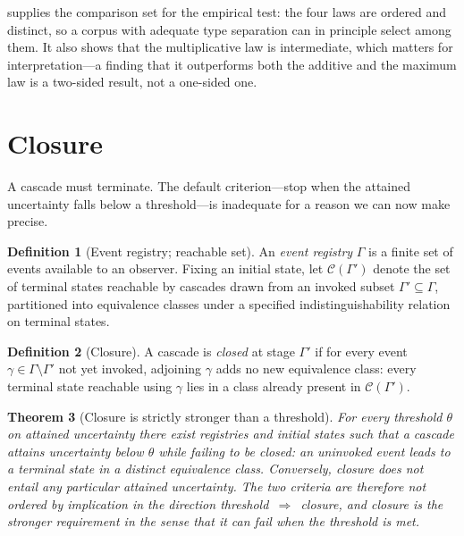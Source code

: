 \documentclass[11pt,a4paper]{article}
\theoremstyle{thmstyle}
\newtheorem{theorem}{Theorem}[section]
\theoremstyle{definition}
\newtheorem{definition}[theorem]{Definition}
\theoremstyle{remark}
\begin{document}
 supplies the comparison set for the empirical test:
the four laws are ordered and distinct, so a corpus with adequate type
separation can in principle select among them. It also shows that the
multiplicative law is intermediate, which matters for interpretation---a
finding that it outperforms both the additive and the maximum law is a
two-sided result, not a one-sided one.

\section{Closure}
\label{sec:closure}

A cascade must terminate. The default criterion---stop when the attained
uncertainty falls below a threshold---is inadequate for a reason we can now
make precise.

\begin{definition}[Event registry; reachable set]
\label{def:registry}
An \emph{event registry} $\Gamma$ is a finite set of events available to an
observer. Fixing an initial state, let $\mathcal{C}(\Gamma')$ denote the set
of terminal states reachable by cascades drawn from an invoked subset
$\Gamma'\subseteq\Gamma$, partitioned into equivalence classes under a
specified indistinguishability relation on terminal states.
\end{definition}

\begin{definition}[Closure]
\label{def:closure}
A cascade is \emph{closed} at stage $\Gamma'$ if for every event
$\gamma\in\Gamma\setminus\Gamma'$ not yet invoked, adjoining $\gamma$ adds
no new equivalence class: every terminal state reachable using $\gamma$ lies
in a class already present in $\mathcal{C}(\Gamma')$.
\end{definition}

\begin{theorem}[Closure is strictly stronger than a threshold]
\label{thm:closure-stronger}
For every threshold $\theta$ on attained uncertainty there exist registries
and initial states such that a cascade attains uncertainty below $\theta$
while failing to be closed: an uninvoked event leads to a terminal state in
a distinct equivalence class. Conversely, closure does not entail any
particular attained uncertainty. The two criteria are therefore not ordered
by implication in the direction threshold~$\Rightarrow$~closure, and closure
is the stronger requirement in the sense that it can fail when the threshold
is met.
\end{theorem}
\end{document}
